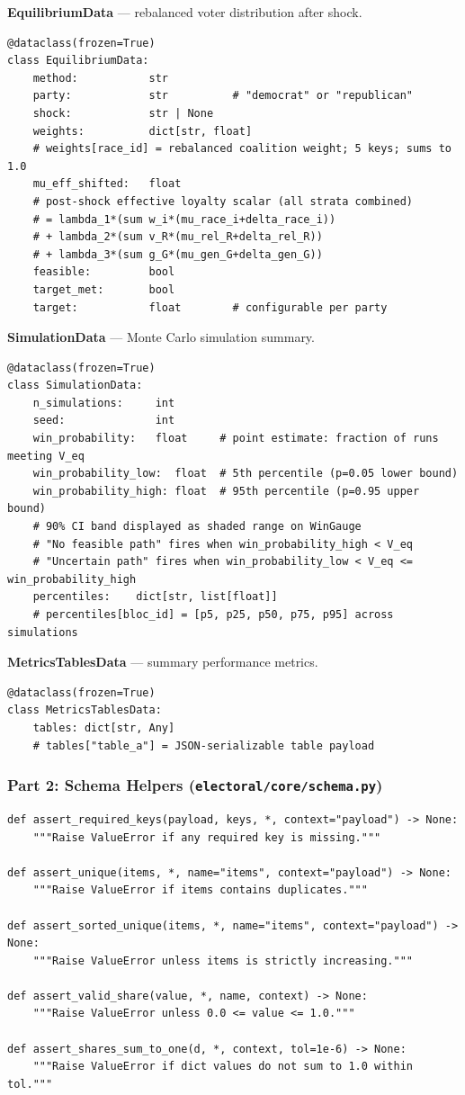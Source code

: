 \documentclass[11pt]{article}
\begin{document}
\noindent\textbf{EquilibriumData} --- rebalanced voter distribution after shock.
\begin{lstlisting}
@dataclass(frozen=True)
class EquilibriumData:
    method:           str
    party:            str          # "democrat" or "republican"
    shock:            str | None
    weights:          dict[str, float]
    # weights[race_id] = rebalanced coalition weight; 5 keys; sums to 1.0
    mu_eff_shifted:   float
    # post-shock effective loyalty scalar (all strata combined)
    # = lambda_1*(sum w_i*(mu_race_i+delta_race_i))
    # + lambda_2*(sum v_R*(mu_rel_R+delta_rel_R))
    # + lambda_3*(sum g_G*(mu_gen_G+delta_gen_G))
    feasible:         bool
    target_met:       bool
    target:           float        # configurable per party
\end{lstlisting}

\noindent\textbf{SimulationData} --- Monte Carlo simulation summary.
\begin{lstlisting}
@dataclass(frozen=True)
class SimulationData:
    n_simulations:     int
    seed:              int
    win_probability:   float     # point estimate: fraction of runs meeting V_eq
    win_probability_low:  float  # 5th percentile (p=0.05 lower bound)
    win_probability_high: float  # 95th percentile (p=0.95 upper bound)
    # 90% CI band displayed as shaded range on WinGauge
    # "No feasible path" fires when win_probability_high < V_eq
    # "Uncertain path" fires when win_probability_low < V_eq <= win_probability_high
    percentiles:    dict[str, list[float]]
    # percentiles[bloc_id] = [p5, p25, p50, p75, p95] across simulations
\end{lstlisting}

\noindent\textbf{MetricsTablesData} --- summary performance metrics.
\begin{lstlisting}
@dataclass(frozen=True)
class MetricsTablesData:
    tables: dict[str, Any]
    # tables["table_a"] = JSON-serializable table payload
\end{lstlisting}

\subsubsection*{Part 2: Schema Helpers (\texttt{electoral/core/schema.py})}

\begin{lstlisting}
def assert_required_keys(payload, keys, *, context="payload") -> None:
    """Raise ValueError if any required key is missing."""

def assert_unique(items, *, name="items", context="payload") -> None:
    """Raise ValueError if items contains duplicates."""

def assert_sorted_unique(items, *, name="items", context="payload") -> None:
    """Raise ValueError unless items is strictly increasing."""

def assert_valid_share(value, *, name, context) -> None:
    """Raise ValueError unless 0.0 <= value <= 1.0."""

def assert_shares_sum_to_one(d, *, context, tol=1e-6) -> None:
    """Raise ValueError if dict values do not sum to 1.0 within tol."""
\end{lstlisting}
\end{document}
